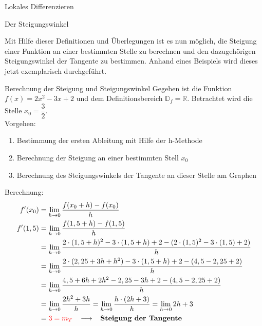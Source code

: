 \begin{section}{Lokales Differenzieren}
\begin{bem*}{Der Steigungswinkel}{}
\begin{center}
\end{center}
\end{bem*}
Mit Hilfe dieser Definitionen und Überlegungen ist es nun möglich, die Steigung einer Funktion an einer bestimmten Stelle zu berechnen und den dazugehörigen Steigungswinkel der Tangente zu bestimmen. Anhand eines Beispiels wird dieses jetzt exemplarisch durchgeführt.
\begin{bsp*}{Berechnung der Steigung und Steigungswinkel}{}
Gegeben ist die Funktion $f(x)= 2x^2 - 3x +2 $ und dem Definitionsbereich $\mathds{D}_f = \mathds{R}$. Betrachtet wird die Stelle $x_0 = \dfrac{3}{2}$.\\
Vorgehen:
\begin{enumerate}
    \item Bestimmung der ersten Ableitung mit Hilfe der h-Methode
    \item Berechnung der Steigung an einer bestimmten Stell $x_0$
    \item Berechnung des Steigungswinkels der Tangente an dieser Stelle am Graphen
\end{enumerate}
Berechnung:
\begin{equation*}
\begin{split}
f'(x_0) &= \lim_{h\rightarrow 0} \dfrac{f(x_0+h)-f(x_0)}{h}\\ f'(1,5)&=\lim_{h\rightarrow 0} \dfrac{f(1,5 +h) - f(1,5)}{h}\\ &= \lim_{h\rightarrow 0} \dfrac{2\cdot (1,5 +h)^2 -3\cdot(1,5+h) + 2-(2\cdot (1,5)^2 - 3\cdot (1,5) + 2)}{h}\\
&= \lim_{h\rightarrow 0} \dfrac{2\cdot (2,25 +3h + h^2) -3\cdot(1,5+h) + 2 - (4,5 -2,25 +2)}{h}\\
&= \lim_{h\rightarrow 0} \dfrac{4,5+6h+2h^2-2,25-3h+2-(4,5 -2,25 +2)}{h}\\
&= \lim_{h\rightarrow 0} \dfrac{2h^2+3h}{h}= \lim_{h\rightarrow 0} \dfrac{h\cdot( 2h+3)}{h} = \lim_{h\rightarrow 0} 2h+3\\
&= \textcolor{red}{3 = m_T} \hspace{0.3cm} \longrightarrow \hspace{0.3cm} \textbf{Steigung der Tangente}
\end{split}
\end{equation*}


\end{bsp*}
\end{section}
